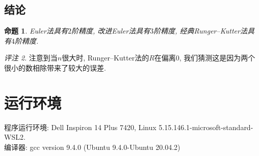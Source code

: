 \documentclass[a4paper]{article}
\theoremstyle{plain}
\newtheorem{prop}{命题}[section]
\theoremstyle{remark}
\newtheorem{rem}[prop]{评注}
\numberwithin{equation}{section}
\begin{document}
\subsection*{结论}

\begin{prop}
    Euler法具有$2$阶精度, 改进Euler法具有$3$阶精度, 经典Runger--Kutter法具有$4$阶精度.
\end{prop}

\begin{rem}
    注意到当$n$很大时, Runger--Kutter法的$R$在偏离$0$, 我们猜测这是因为两个很小的数相除带来了较大的误差.
\end{rem}

\section{运行环境}
\noindent 程序运行环境: Dell Inspiron 14 Plus 7420, Linux 5.15.146.1-microsoft-standard-WSL2.\\
编译器: gcc version 9.4.0 (Ubuntu 9.4.0-Ubuntu 20.04.2)
\end{document}
